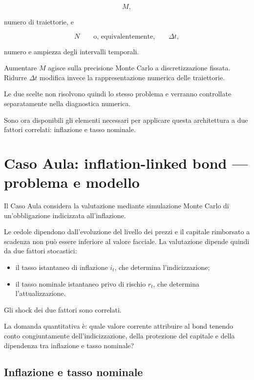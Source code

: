 \[
M,
\]

\noindent numero di traiettorie, e

\[
N
\qquad\text{o, equivalentemente,}\qquad
\Delta t,
\]

\noindent numero e ampiezza degli intervalli temporali.

Aumentare \(M\) agisce sulla precisione Monte Carlo a discretizzazione
fissata. Ridurre \(\Delta t\) modifica invece la rappresentazione numerica
delle traiettorie.

Le due scelte non risolvono quindi lo stesso problema e verranno controllate
separatamente nella diagnostica numerica.

Sono ora disponibili gli elementi necessari per applicare questa architettura
a due fattori correlati: inflazione e tasso nominale.


\section{Caso Aula: inflation-linked bond --- problema e modello}

Il Caso Aula considera la valutazione mediante simulazione Monte Carlo di
un'obbligazione indicizzata all'inflazione.

Le cedole dipendono dall'evoluzione del livello dei prezzi e il capitale
rimborsato a scadenza non pu\`o essere inferiore al valore facciale. La
valutazione dipende quindi da due fattori stocastici:

\begin{itemize}

\item il tasso istantaneo di inflazione \(i_t\), che determina
l'indicizzazione;

\item il tasso nominale istantaneo privo di rischio \(r_t\), che determina
l'attualizzazione.

\end{itemize}

Gli shock dei due fattori sono correlati.

La domanda quantitativa \`e: quale valore corrente attribuire al bond tenendo
conto congiuntamente dell'indicizzazione, della protezione del capitale e della
dipendenza tra inflazione e tasso nominale?

\subsection{Inflazione e tasso nominale}

